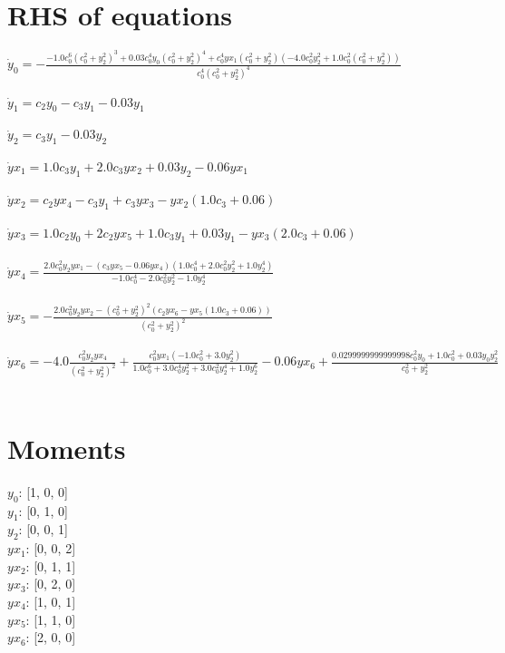 \documentclass{article}
\begin{document}
\section*{RHS of equations}
$\dot y_{0} = - \frac{- 1.0 c_{0}^{6} \left(c_{0}^{2} + y_{2}^{2}\right)^{3} + 0.03 c_{0}^{4} y_{0} \left(c_{0}^{2} + y_{2}^{2}\right)^{4} + c_{0}^{4} yx_{1} \left(c_{0}^{2} + y_{2}^{2}\right) \left(- 4.0 c_{0}^{2} y_{2}^{2} + 1.0 c_{0}^{2} \left(c_{0}^{2} + y_{2}^{2}\right)\right)}{c_{0}^{4} \left(c_{0}^{2} + y_{2}^{2}\right)^{4}}$\\\\$\dot y_{1} = c_{2} y_{0} - c_{3} y_{1} - 0.03 y_{1}$\\\\$\dot y_{2} = c_{3} y_{1} - 0.03 y_{2}$\\\\$\dot yx_{1} = 1.0 c_{3} y_{1} + 2.0 c_{3} yx_{2} + 0.03 y_{2} - 0.06 yx_{1}$\\\\$\dot yx_{2} = c_{2} yx_{4} - c_{3} y_{1} + c_{3} yx_{3} - yx_{2} \left(1.0 c_{3} + 0.06\right)$\\\\$\dot yx_{3} = 1.0 c_{2} y_{0} + 2 c_{2} yx_{5} + 1.0 c_{3} y_{1} + 0.03 y_{1} - yx_{3} \left(2.0 c_{3} + 0.06\right)$\\\\$\dot yx_{4} = \frac{2.0 c_{0}^{2} y_{2} yx_{1} - \left(c_{3} yx_{5} - 0.06 yx_{4}\right) \left(1.0 c_{0}^{4} + 2.0 c_{0}^{2} y_{2}^{2} + 1.0 y_{2}^{4}\right)}{- 1.0 c_{0}^{4} - 2.0 c_{0}^{2} y_{2}^{2} - 1.0 y_{2}^{4}}$\\\\$\dot yx_{5} = - \frac{2.0 c_{0}^{2} y_{2} yx_{2} - \left(c_{0}^{2} + y_{2}^{2}\right)^{2} \left(c_{2} yx_{6} - yx_{5} \left(1.0 c_{3} + 0.06\right)\right)}{\left(c_{0}^{2} + y_{2}^{2}\right)^{2}}$\\\\$\dot yx_{6} = - 4.0 \frac{c_{0}^{2} y_{2} yx_{4}}{\left(c_{0}^{2} + y_{2}^{2}\right)^{2}} + \frac{c_{0}^{2} yx_{1} \left(- 1.0 c_{0}^{2} + 3.0 y_{2}^{2}\right)}{1.0 c_{0}^{6} + 3.0 c_{0}^{4} y_{2}^{2} + 3.0 c_{0}^{2} y_{2}^{4} + 1.0 y_{2}^{6}} - 0.06 yx_{6} + \frac{0.0299999999999998 c_{0}^{2} y_{0} + 1.0 c_{0}^{2} + 0.03 y_{0} y_{2}^{2}}{c_{0}^{2} + y_{2}^{2}}$\\\\
\section*{Moments}

$y_{0}$: {[1, 0, 0]}\\
$y_{1}$: {[0, 1, 0]}\\
$y_{2}$: {[0, 0, 1]}\\
$yx_{1}$: {[0, 0, 2]}\\
$yx_{2}$: {[0, 1, 1]}\\
$yx_{3}$: {[0, 2, 0]}\\
$yx_{4}$: {[1, 0, 1]}\\
$yx_{5}$: {[1, 1, 0]}\\
$yx_{6}$: {[2, 0, 0]}\\
\end{document}
